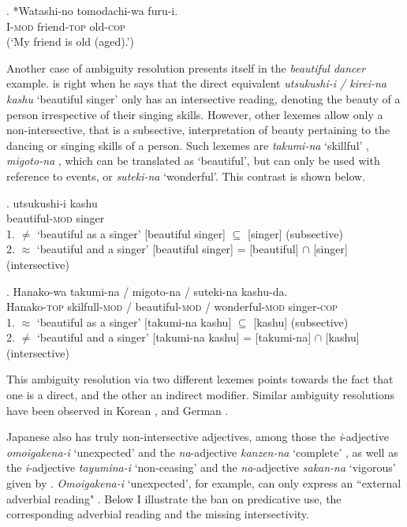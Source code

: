 \exg. *Watashi-no tomodachi-wa furu-i.\\
I-\textsc{mod} friend-\textsc{top} old-\textsc{cop}\\
(`My friend is old (aged).’)

Another case of ambiguity resolution presents itself in the \textit{beautiful dancer} example. \citet[3]{baker:2003:verbal} is right when he says that the direct equivalent \textit{utsukushi-i / kirei-na kashu} `beautiful singer’ only has an intersective reading, denoting the beauty of a person irrespective of their singing skills. However, other lexemes allow only a non-intersective, that is a subsective, interpretation of beauty pertaining to the dancing or singing skills of a person. Such lexemes are \textit{takumi-na} `skillful’ \citep[101, Footnote 2]{ayano:2010:revisiting}, \textit{migoto-na} \citep[786]{watanabe:2017:attributive}, which can be translated as `beautiful’, but can only be used with reference to events, or \textit{suteki-na} `wonderful'. This contrast is shown below.

\exg. utsukushi-i kashu\\
beautiful-\textsc{mod} singer \null \hfill \citep[3]{baker:2003:verbal}\\
1. $\neq$ `beautiful as a singer’ [beautiful singer] $\subseteq$ [singer] (subsective)\\
2. $\approx$ `beautiful and a singer’ [beautiful singer] = [beautiful] $\cap$ [singer] (intersective)

\exg. Hanako-wa takumi-na / migoto-na / suteki-na kashu-da.\\
Hanako-\textsc{top} skilfull-\textsc{mod} / beautiful-\textsc{mod} / wonderful-\textsc{mod} singer-\textsc{cop}\\
1. $\approx$ `beautiful as a singer’ [takumi-na kashu] $\subseteq$ [kashu] (subsective)\\
2. $\neq$ `beautiful and a singer’ [takumi-na kashu] = [takumi-na] $\cap$ [kashu] (intersective)

This ambiguity resolution via two different lexemes points towards the fact that one is a direct, and the other an indirect modifier. Similar ambiguity resolutions have been observed in Korean \citep[161]{kang:2005:adj}, and German \citep[69]{maienborn:2020:revisiting}.  

Japanese also has truly non-intersective adjectives, among those the \textit{i}-adjective \textit{omoigakena-i} `unexpected' and the \textit{na}-adjective \textit{kanzen-na} `complete' \citep[67–68]{yamakido:2005:nature}, as well as the \textit{i}-adjective \textit{tayumina-i} `non-ceasing' and the \textit{na}-adjective \textit{sakan-na} `vigorous' given by \citet{ayano:2010:revisiting}. \textit{Omoigakena-i} `unexpected', for example, can only express an ``external adverbial reading" \citep[64]{yamakido:2005:nature}. Below I illustrate the ban on predicative use, the corresponding adverbial reading and the missing intersectivity.

